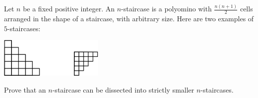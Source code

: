 Let $n$ be a fixed positive integer. An $n$-staircase is a polyomino with $\frac{n(n+1)}{2}$ cells arranged in the shape of a staircase, with arbitrary size. Here are two examples of $5$-staircases:

\begin{center}
\includegraphics[width = 50.400000000000006mm]{img/fig0.png}
\end{center}
Prove that an $n$-staircase can be dissected into strictly smaller $n$-staircases.

